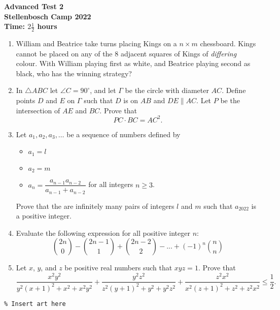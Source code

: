 \documentclass{article}
\begin{document}
\thispagestyle{empty}

\begin{center}
  \textbf{\Large Advanced Test 2}
  \\ \vspace{1em}
  \textbf{\large Stellenbosch Camp 2022}
  \\ \vspace{1em}
  \textbf{\large Time: $2\frac{1}{2}$ hours}
\end{center}

\bigskip

\vfill

\begin{enumerate}[itemsep=\fill]

\item %
William and Beatrice take turns placing Kings on a $n \times m$ chessboard.
Kings cannot be placed on any of the 8 adjacent squares of Kings of \emph{differing} colour.
With William playing first as white, and Beatrice playing second as black, who has the winning strategy?


\item %
In $\triangle ABC$ let $\angle C = 90^\circ$, and let $\Gamma$ be the circle with diameter $AC$.
Define points $D$ and $E$ on $\Gamma$ such that $D$ is on $AB$ and $DE \parallel AC$.
Let $P$ be the intersection of $AE$ and $BC$.
Prove that
\[ PC \cdot BC = AC^2. \]

\vspace{0pt}


\item %
Let $a_1, a_2, a_3, \dots$ be a sequence of numbers defined by 
\begin{itemize}
	\item $a_1 = l$
	\item $a_2 = m$
	\item $a_n = \dfrac{a_{n-1}a_{n-2}}{a_{n-1}+a_{n-2}}$ for all integers $n \geq 3$.
\end{itemize}
Prove that the are infinitely many pairs of integers $l$ and $m$ such that $a_{2022}$ is a positive integer.


\item %
Evaluate the following expression for all positive integer $n$:
\[ {2n \choose 0} -{2n-1 \choose 1}+{2n-2 \choose 2}-...+(-1)^n{n \choose n} \]

\vspace{0pt}


\item %
Let $x$, $y$, and $z$ be positive real numbers such that $xyz = 1$.
Prove that
\[ \frac{x^2y^2}{y^2(x+1)^2+x^2+x^2y^2} +\frac{y^2z^2}{z^2(y+1)^2+y^2+y^2z^2} +\frac{z^2x^2}{x^2(z+1)^2+z^2+z^2x^2} \leq \frac{1}{2}. \]

\end{enumerate}


\vfill
\centering
\small
\begin{BVerbatim}
\end{BVerbatim}
\end{document}
